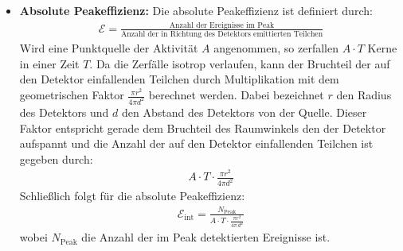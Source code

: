 \documentclass[11pt, a4paper]{article}
\numberwithin{equation}{section}
\begin{document}
\begin{itemize}
	\item \textbf{Absolute Peakeffizienz:}
	Die absolute Peakeffizienz ist definiert durch:
	\begin{align*}
		\mathcal{E} = \frac{\text{Anzahl der Ereignisse im Peak}}{\text{Anzahl der in Richtung des Detektors emittierten Teilchen}}
	\end{align*}
	Wird eine Punktquelle der Aktivität $A$ angenommen, so zerfallen $A\cdot T$ Kerne in einer Zeit $T$.
	Da die Zerfälle isotrop verlaufen, kann der Bruchteil der auf den Detektor einfallenden Teilchen durch Multiplikation mit dem geometrischen Faktor $\frac{\pi r^2}{4 \pi d^2}$ berechnet werden.
	Dabei bezeichnet $r$ den Radius des Detektors und $d$ den Abstand des Detektors von der Quelle.
	Dieser Faktor entspricht gerade dem Bruchteil des Raumwinkels den der Detektor aufspannt und die Anzahl der auf den Detektor einfallenden Teilchen ist gegeben durch:
	\begin{align*}
		A \cdot T \cdot \frac{\pi r^2}{4 \pi d^2}
	\end{align*}
	Schließlich folgt für die absolute Peakeffizienz:
	\begin{align}
		\label{eq:peakeffizienz}
		\mathcal{E}_\mathrm{int} = \frac{N_\mathrm{Peak}}{A \cdot T \cdot \frac{\pi r^2}{4\pi \, d^2}}
	\end{align}
	wobei $N_\mathrm{Peak}$ die Anzahl der im Peak detektierten Ereignisse ist.
\end{itemize}
\end{document}
